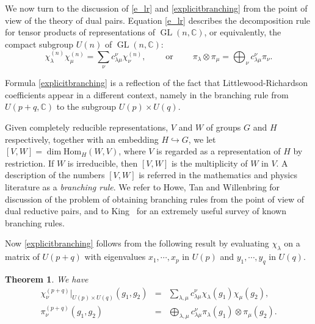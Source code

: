 \documentclass[11pt]{amsart}
\newcommand{\tmop}[1]{\ensuremath{\operatorname{#1}}}
\newtheorem{theorem}{Theorem}
\begin{document}
We now turn to the discussion of \eqref{e_lr} and
\eqref{explicitbranching}  from the point of view of the theory of
dual pairs. Equation \eqref{e_lr} describes  the decomposition
rule for tensor products of representations of $\tmop{GL} (
n,\mathbb{C})$, or equivalently, the compact subgroup $U ( n )$ of
$\tmop{GL} ( n,\mathbb{C})$:
\[ \chi_{\lambda}^{( n )} \chi_{\mu}^{( n )} = \sum_{\nu} c_{\lambda
  \mu}^{\nu} \chi_{\nu}^{( n )}, \hspace{2em} \tmop{or} \hspace{2em}
  \pi_{\lambda} \otimes \pi_{\mu} = \bigoplus_{\nu} c_{\lambda \mu}^{\nu}
  \pi_{\nu} . \]

Formula \eqref{explicitbranching} is a reflection of the fact that
Littlewood-Richardson coefficients appear in a different context,
namely in the branching rule from $U ( p + q,\mathbb{C})$ to the
subgroup $U ( p ) \times U ( q )$.

Given completely reducible representations, $V$ and $W$ of groups
$G$ and $H$ respectively, together with an embedding $H
\hookrightarrow G$, we let $[ V, W ] = \dim \text{Hom}_H \left( W,
V \right)$, where $V$ is regarded as a representation of $H$ by
restriction. If $W$ is irreducible, then $[ V, W ]$ is the
multiplicity of $W$ in $V$. A description of the numbers $[ V, W
]$ is referred in the mathematics and physics literature as a
\textit{branching rule}. We refer to Howe, Tan and Willenbring
{\cite{HoweTanWillenbring}} for discussion of the problem of
obtaining branching rules from the point of view of dual reductive
pairs, and to King~{\cite{KingBranching}} for an extremely useful
survey of known branching rules.

Now \eqref{explicitbranching} follows from the following result by
evaluating $\chi_{\lambda}$ on a matrix of $U ( p + q )$ with
eigenvalues $x_1, \cdots, x_p$ in $U ( p )$ and $y_1, \cdots, y_q$
in $U ( q )$.
\begin{theorem}
\label{uuubranchingrule} We have
\begin{eqnarray}
   \chi_{\nu}^{( p + q )} |_{U ( p ) \times U ( q )} ( g_1, g_2 ) & = &
   \sum_{\lambda, \mu} c_{\lambda \mu}^{\nu} \chi_{\lambda} ( g_1 )
   \chi_{\mu} ( g_2 ), \nonumber\\
   \pi_{\nu}^{( p + q )} ( g_1, g_2 ) & = & \bigoplus_{\lambda, \mu}
   c_{\lambda \mu}^{\nu} \pi_{\lambda} ( g_1 ) \otimes \pi_{\mu} ( g_2 ) .
   \label{ratiosupqbranching}
\end{eqnarray}
\end{theorem}
\end{document}
